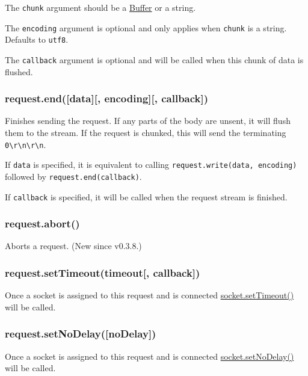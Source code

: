 The \texttt{chunk} argument should be a
\href{buffer.html\#buffer_buffer}{Buffer} or a string.

The \texttt{encoding} argument is optional and only applies when
\texttt{chunk} is a string. Defaults to
\texttt{\textquotesingle{}utf8\textquotesingle{}}.

The \texttt{callback} argument is optional and will be called when this
chunk of data is flushed.

\subsubsection{request.end({[}data{]}{[}, encoding{]}{[},
callback{]})}\label{request.enddata-encoding-callback}

Finishes sending the request. If any parts of the body are unsent, it
will flush them to the stream. If the request is chunked, this will send
the terminating
\texttt{\textquotesingle{}0\textbackslash{}r\textbackslash{}n\textbackslash{}r\textbackslash{}n\textquotesingle{}}.

If \texttt{data} is specified, it is equivalent to calling
\texttt{request.write(data,\ encoding)} followed by
\texttt{request.end(callback)}.

If \texttt{callback} is specified, it will be called when the request
stream is finished.

\subsubsection{request.abort()}\label{request.abort}

Aborts a request. (New since v0.3.8.)

\subsubsection{request.setTimeout(timeout{[},
callback{]})}\label{request.settimeouttimeout-callback}

Once a socket is assigned to this request and is connected
\href{net.html\#net_socket_settimeout_timeout_callback}{socket.setTimeout()}
will be called.

\subsubsection{request.setNoDelay({[}noDelay{]})}\label{request.setnodelaynodelay}

Once a socket is assigned to this request and is connected
\href{net.html\#net_socket_setnodelay_nodelay}{socket.setNoDelay()} will
be called.


